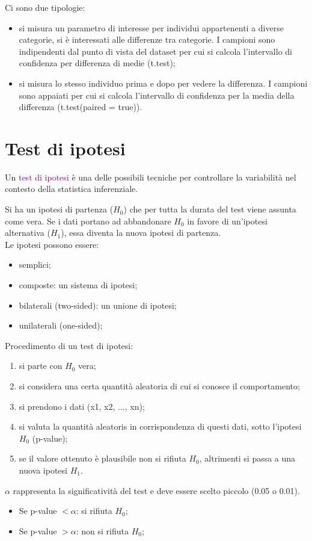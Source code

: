 Ci sono due tipologie:

\begin{itemize}
    \item si misura un parametro di interesse per individui appartenenti a diverse categorie, si è interessati alle differenze tra categorie. I campioni sono indipendenti dal punto di vista del dataset per cui si calcola l'intervallo di confidenza per differenza di medie (t.test);
    \item si misura lo stesso individuo prima e dopo per vedere la differenza. I campioni sono appaiati per cui si calcola l'intervallo di confidenza per la media della differenza (t.test(paired = true)).
\end{itemize}

\section{Test di ipotesi}

Un \textcolor{purple}{test di ipotesi} è una delle possibili tecniche per controllare la variabilità nel contesto della statistica inferenziale.

Si ha un ipotesi di partenza ($H_0$) che per tutta la durata del test viene assunta come vera. Se i dati portano ad abbandonare $H_0$ in favore di un'ipotesi alternativa ($H_1$), essa diventa la nuova ipotesi di partenza.
\\
Le ipotesi possono essere:
\begin{itemize}
    \item semplici;
    \item composte: un sistema di ipotesi;
    \item bilaterali (two-sided): un unione di ipotesi;
    \item unilaterali (one-sided);
\end{itemize}

Procedimento di un test di ipotesi:
\begin{enumerate}
    \item si parte con $H_0$ vera;
    \item si considera una certa quantità aleatoria di cui si conosce il comportamento;
    \item si prendono i dati (x1, x2, ..., xn);
    \item si valuta la quantità aleatoris in corrispondenza di questi dati, sotto l'ipotesi $H_0$ (p-value);
    \item se il valore ottenuto è plausibile non si rifiuta $H_0$, altrimenti si passa a una nuova ipotesi $H_1$.
\end{enumerate}

$\alpha$ rappresenta la significatività del test e deve essere scelto piccolo (0.05 o 0.01).

\begin{itemize}
    \item Se p-value $< \alpha$: si rifiuta $H_0$;
        \item Se p-value $> \alpha$: non si rifiuta $H_0$;
\end{itemize}